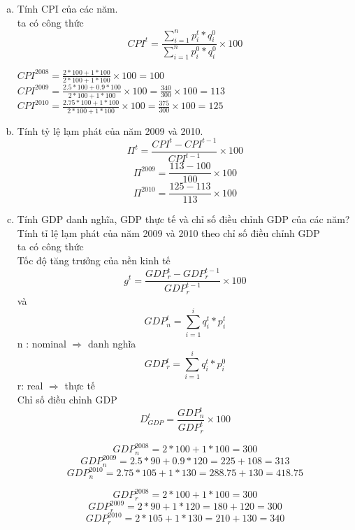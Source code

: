 \begin{enumerate}[a.]
  \item Tính CPI của các năm. \\
        ta có công thức
        $$CPI^t = \frac{\sum^{n}_{i=1}p^t_i * q^0_i}{\sum^{n}_{i=1}p^0_i * q^0_i} \times 100$$

        $CPI^{2008} = \frac{2 * 100 + 1 * 100}{2 * 100 + 1 * 100} \times 100 = 100$\\
        $CPI^{2009} = \frac{2.5 * 100 + 0.9 * 100}{2 * 100 + 1 * 100} \times 100 = \frac{340}{300}  \times 100 = 113 $\\
        $CPI^{2010} = \frac{2.75 * 100 + 1 * 100}{2 * 100 + 1 * 100} \times 100 = \frac{375}{300}  \times 100 = 125 $\\

  \item  Tính tỷ lệ lạm phát của năm 2009 và 2010.
        $$\Pi^t = \frac{CPI^t - CPI^{t -1}}{CPI^{t -1}} \times 100$$
        $$\Pi^{2009} = \frac{113 - 100}{100}  \times 100$$
        $$\Pi^{2010} = \frac{125 - 113}{113}  \times 100$$

  \item  Tính GDP danh nghĩa, GDP thực tế và chỉ số điều chỉnh GDP của các năm? Tính tỉ lệ lạm phát của năm 2009 và 2010 theo chỉ số điều chỉnh GDP \\
        ta có công thức\\
        Tốc độ tăng trưởng của nền kinh tế
        $$g^t = \frac{GDP^{t}_r - GDP^{t - 1}_r}{GDP^{t - 1}_r} \times 100  $$
        và        
        $$ GDP^t_n = \sum^{i}_{i = 1} q^t_i  * p^t_i $$
        n : nominal  $\Rightarrow$ danh nghĩa
        $$ GDP^t_r = \sum^{i}_{i = 1} q^t_i  * p^0_i $$
        r: real $\Rightarrow$ thực tế\\
        Chỉ số điều chỉnh GDP
        $$D^t_{GDP} = \frac{GDP^t_n}{GDP^t_r} \times 100$$

        $$ GDP^{2008}_n = 2 * 100 +1 * 100 = 300 $$
        $$ GDP^{2009}_n = 2.5 * 90 + 0.9 * 120 = 225 + 108 = 313 $$
        $$ GDP^{2010}_n = 2.75 * 105 + 1 * 130 = 288.75 + 130 = 418.75 $$

        $$ GDP^{2008}_r = 2 * 100 + 1 * 100 = 300 $$
        $$ GDP^{2009}_r = 2 * 90 + 1 * 120 = 180 + 120 = 300 $$
        $$ GDP^{2010}_r = 2 * 105 + 1 * 130 = 210 + 130 = 340 $$


\end{enumerate}
